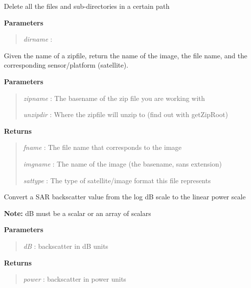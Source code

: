 \documentclass[letterpaper,10pt,english]{sphinxmanual}
\begin{document}

\begin{fulllineitems}
\label{code:Util.deltree}
Delete all the files and sub-directories in a certain path

\textbf{Parameters}
\begin{quote}

\emph{dirname}   :
\end{quote}

\end{fulllineitems}


\begin{fulllineitems}
\label{code:Util.getFilename}
Given the name of a zipfile, return the name of the image,
the file name, and the corresponding sensor/platform (satellite).

\textbf{Parameters}
\begin{quote}

\emph{zipname}  : The basename of the zip file you are working with

\emph{unzipdir} : Where the zipfile will unzip to (find out with getZipRoot)
\end{quote}

\textbf{Returns}
\begin{quote}

\emph{fname}    :  The file name that corresponds to the image

\emph{imgname}  : The name of the image (the basename, sans extension)

\emph{sattype}  : The type of satellite/image format this file represents
\end{quote}

\end{fulllineitems}


\begin{fulllineitems}
\label{code:Util.getPowerScale}
Convert a SAR backscatter value from the log dB scale to the linear power scale

\textbf{Note:} dB must be a scalar or an array of scalars

\textbf{Parameters}
\begin{quote}

\emph{dB}    : backscatter in dB units
\end{quote}

\textbf{Returns}
\begin{quote}

\emph{power} : backscatter in power units
\end{quote}

\end{fulllineitems}
\end{document}

